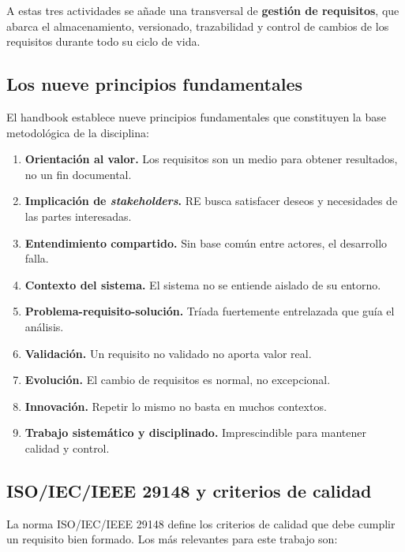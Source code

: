 A estas tres actividades se a\~nade una transversal de \textbf{gesti\'on de requisitos}, que abarca el almacenamiento, versionado, trazabilidad y control de cambios de los requisitos durante todo su ciclo de vida.

\subsection{Los nueve principios fundamentales}

El handbook establece nueve principios fundamentales \cite[pp.~16--18]{cpre} que constituyen la base metodol\'ogica de la disciplina:

\begin{enumerate}[leftmargin=1.2em]
    \item \textbf{Orientaci\'on al valor.} Los requisitos son un medio para obtener resultados, no un fin documental.
    \item \textbf{Implicaci\'on de \emph{stakeholders}.} RE busca satisfacer deseos y necesidades de las partes interesadas.
    \item \textbf{Entendimiento compartido.} Sin base com\'un entre actores, el desarrollo falla.
    \item \textbf{Contexto del sistema.} El sistema no se entiende aislado de su entorno.
    \item \textbf{Problema-requisito-soluci\'on.} Tr\'iada fuertemente entrelazada que gu\'ia el an\'alisis.
    \item \textbf{Validaci\'on.} Un requisito no validado no aporta valor real.
    \item \textbf{Evoluci\'on.} El cambio de requisitos es normal, no excepcional.
    \item \textbf{Innovaci\'on.} Repetir lo mismo no basta en muchos contextos.
    \item \textbf{Trabajo sistem\'atico y disciplinado.} Imprescindible para mantener calidad y control.
\end{enumerate}

\subsection{ISO/IEC/IEEE 29148 y criterios de calidad}

La norma ISO/IEC/IEEE 29148 \cite{iso29148} define los criterios de calidad que debe cumplir un requisito bien formado. Los m\'as relevantes para este trabajo son:


